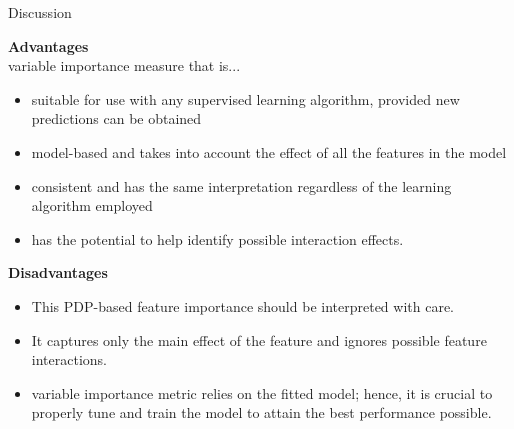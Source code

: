 \documentclass[11pt,compress,t,notes=noshow, aspectratio=169, xcolor=table]{beamer}
\begin{document}
\begin{frame}{Discussion}

\textbf{Advantages} \\
variable importance measure that is...
\begin{itemize}
    \item  suitable for use with any supervised learning algorithm, provided new predictions can be obtained
    \item model-based and takes into account the effect of all the features in the model
    \item consistent and has the same interpretation regardless of the learning algorithm employed
    \item has the potential to help identify possible interaction effects.
\end{itemize}

\textbf{Disadvantages} \\
\begin{itemize}
    \item This PDP-based feature importance should be interpreted with care.
    \item It captures only the main effect of the feature and ignores possible feature interactions.
    \item variable importance metric relies on the fitted model; hence, it is crucial to properly tune and train the model to attain the best performance possible.
\end{itemize}
% 
\end{frame}
\endlecture
\end{document}
